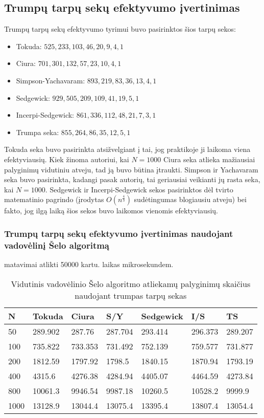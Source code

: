 \documentclass{VUMIFInfKursinis}
\begin{document}
\subsection{Trumpų tarpų sekų efektyvumo įvertinimas}
Trumpų tarpų sekų efektyvumo tyrimui buvo pasirinktos šios tarpų sekos:
\begin{itemize}
  \item Tokuda: $525,233,103,46,20,9,4,1$
  \item Ciura: $701,301,132,57,23,10,4,1$
  \item Simpson-Yachavaram: $893,219,83,36,13,4,1$
  \item Sedgewick: $929,505,209,109,41,19,5,1$
  \item Incerpi-Sedgewick: $861,336,112,48,21,7,3,1$
  \item Trumpa seka: $855,264,86,35,12,5,1$
\end{itemize}
Tokuda \cite{10.5555/645569.659879} seka buvo pasirinkta atsižvelgiant į tai, jog praktikoje ji laikoma viena efektyviausių.
Kiek žinoma autoriui, kai $N=1000$ Ciura \cite{ciura2001best} seka atlieka mažiausiai palyginimų vidutiniu atveju, tad ją buvo būtina įtraukti.
Simpson ir Yachavaram \cite{simpson1999faster} seka buvo pasirinkta, kadangi pasak autorių,
tai geriausiai veikianti jų rasta seka, kai $N=1000$.
Sedgewick \cite{SEDGEWICK1986159} ir Incerpi-Sedgewick \cite{incerpi1985improved} sekos pasirinktos dėl tvirto matematinio pagrindo
(įrodytas $O(n^\frac{4}{3})$ sudėtingumas blogiausiu atveju) bei fakto, jog ilgą laiką šios sekos buvo laikomos vienomis efektyviausių.

\subsubsection{Trumpų tarpų sekų efektyvumo įvertinimas naudojant vadovėlinį Šelo algoritmą}
matavimai atlikti 50000 kartu. laikas mikrosekundem.

\begin{table}[H]
  \caption{Vidutinis vadovėlinio Šelo algoritmo atliekamų palyginimų skaičius naudojant trumpas tarpų sekas}
  \begin{tabular}{|l|l|l|l|l|l|l|}
  \hline
  N    & Tokuda  & Ciura   & S/Y     & Sedgewick & I/S     & TS      \\ \hline
  50   & 289.902 & 287.76  & 287.704 & 293.414   & 296.373 & 289.207 \\ \hline
  100  & 735.822 & 733.353 & 731.492 & 752.139   & 759.577 & 731.877 \\ \hline
  200  & 1812.59 & 1797.92 & 1798.5  & 1840.15   & 1870.94 & 1793.19 \\ \hline
  400  & 4315.6  & 4276.38 & 4284.94 & 4405.07   & 4464.59 & 4273.84 \\ \hline
  800  & 10061.3 & 9946.54 & 9987.18 & 10260.5   & 10528.2 & 9999.9  \\ \hline
  1000 & 13128.9 & 13044.4 & 13075.4 & 13395.4   & 13807.4 & 13054.4 \\ \hline
  \end{tabular}
\end{table}
\end{document}
